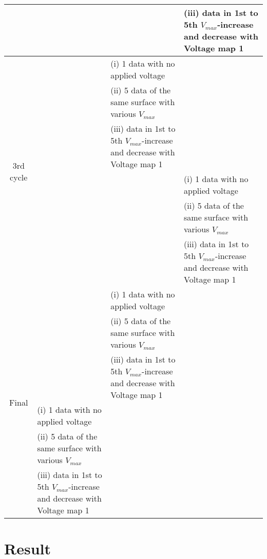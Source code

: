 \documentclass[a4paper]{article}
\begin{document}
\begin{landscape}
\begin{table}[htbp]
\begin{center}
{\begin{tabular}{|c|l|l|l|}
                                       & & & \shortstack{(iii) data in 1st to 5th $V_{max}$-increase and decrease \\ with Voltage map 1} \\ \hline
            \multirow{6}{*}{3rd cycle} & & (i) 1 data with no applied voltage & \\
                                       & & (ii) 5 data of the same surface with various $V_{max}$ & \\
                                       & & \shortstack{(iii) data in 1st to 5th $V_{max}$-increase and decrease \\ with Voltage map 1} & \\ \cline{2-4}
                                       & & & (i) 1 data with no applied voltage \\
                                       & & & (ii) 5 data of the same surface with various $V_{max}$ \\
                                       & & & \shortstack{(iii) data in 1st to 5th $V_{max}$-increase and decrease \\ with Voltage map 1} \\ \hline
                \multirow{6}{*}{Final} & & (i) 1 data with no applied voltage & \\
                                       & & (ii) 5 data of the same surface with various $V_{max}$ & \\
                                       & & \shortstack{(iii) data in 1st to 5th $V_{max}$-increase and decrease \\ with Voltage map 1} & \\ \cline{2-4}
                                       & (i) 1 data with no applied voltage & & \\
                                       & (ii) 5 data of the same surface with various $V_{max}$ & & \\
                                       & \shortstack{(iii) data in 1st to 5th $V_{max}$-increase and decrease \\ with Voltage map 1} & & \\ \hline
            \end{tabular}
            }
       \end{center}
\end{table}
\end{landscape}


\section{Result}
\label{Result}
\end{document}
